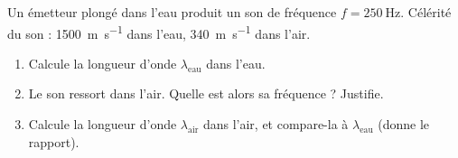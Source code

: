 \documentclass[11pt,a4paper]{article}
\begin{document}
\begin{exo}
Un émetteur plongé dans l'eau produit un son de fréquence $f=\SI{250}{\hertz}$. Célérité du son :
\SI{1500}{\metre\per\second} dans l'eau, \SI{340}{\metre\per\second} dans l'air.
\begin{enumerate}[label=\alph*)]
  \item Calcule la longueur d'onde $\lambda_{\text{eau}}$ dans l'eau.
  \item Le son ressort dans l'air. Quelle est alors sa fréquence ? Justifie.
  \item Calcule la longueur d'onde $\lambda_{\text{air}}$ dans l'air, et compare-la à
        $\lambda_{\text{eau}}$ (donne le rapport).
\end{enumerate}
\end{exo}
\end{document}
